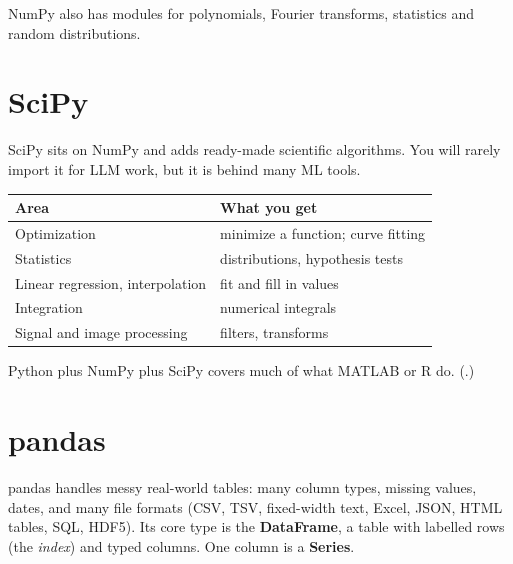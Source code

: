 NumPy also has modules for polynomials, Fourier transforms, statistics and random distributions.

\section{SciPy}

SciPy sits on NumPy and adds ready-made scientific algorithms. You will rarely import it for
LLM work, but it is behind many ML tools.

\begin{center}
\begin{tabularx}{\linewidth}{@{}l X@{}}
\toprule
\textbf{Area} & \textbf{What you get} \\
\midrule
Optimization & minimize a function; curve fitting \\
Statistics & distributions, hypothesis tests \\
Linear regression, interpolation & fit and fill in values \\
Integration & numerical integrals \\
Signal and image processing & filters, transforms \\
\bottomrule
\end{tabularx}
\end{center}

Python plus NumPy plus SciPy covers much of what MATLAB or R do. (.)

\section{pandas}

pandas handles messy real-world tables: many column types, missing values, dates, and many file
formats (CSV, TSV, fixed-width text, Excel, JSON, HTML tables, SQL, HDF5). Its core type is the
\textbf{DataFrame}, a table with labelled rows (the \emph{index}) and typed columns. One column is a
\textbf{Series}.

